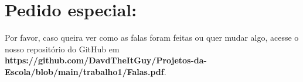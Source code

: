 \section{Pedido especial:}
Por favor, caso queira ver como as falas foram feitas ou quer mudar algo, acesse o nosso repositório do GitHub em \textbf{https://github.com/DavdTheItGuy/Projetos-da-Escola/blob/main/trabalho1/Falas.pdf}.